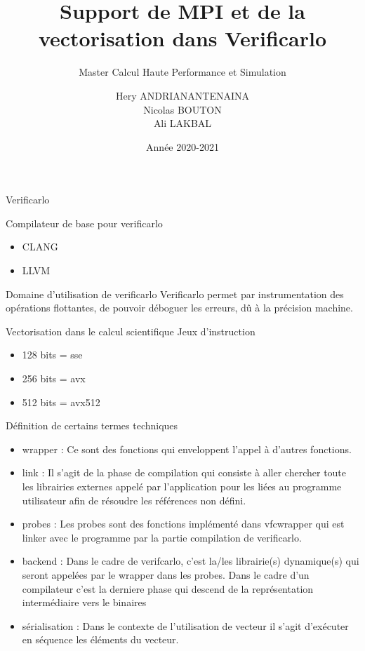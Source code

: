 \documentclass{beamer}
\title[Support pour Verificarlo]{Support de MPI et de la vectorisation dans Verificarlo}
\subtitle{Master Calcul Haute Performance et Simulation}
\author[Hery, Nicolas, Ali]{Hery ANDRIANANTENAINA \\ Nicolas BOUTON \\ Ali LAKBAL}
\institute[]{\textbf{Encadrant:} Eric PETIT}
\date{Année 2020-2021}
\begin{document}
\maketitle

\begin{frame}{Verificarlo}
    \begin{block}{Compilateur de base pour verificarlo}
      \begin{itemize}
          \item CLANG
          \item LLVM
      \end{itemize}
    \end{block}
  \begin{block}{Domaine d'utilisation de verificarlo}
    Verificarlo permet par instrumentation des opérations flottantes, de pouvoir déboguer les erreurs, dû à la précision machine.
  \end{block}
  \begin{block}{Vectorisation dans le calcul scientifique}
    Jeux d'instruction 
        \begin{itemize}
            \item 128 bits = sse
            \item 256 bits = avx
            \item 512 bits = avx512
        \end{itemize}
  \end{block}
\end{frame}

\begin{frame}{Définition de certains termes techniques}
      \begin{itemize}
          \item wrapper : Ce sont des fonctions qui enveloppent l’appel à d’autres fonctions.
          \item link : Il s’agit de la phase de compilation qui consiste à aller chercher toute les librairies externes appelé par l’application pour les liées au programme utilisateur afin de résoudre les références non défini.
          \item probes : Les probes sont des fonctions implémenté dans vfcwrapper qui est linker avec le programme par la partie compilation de verificarlo.
          \item backend : Dans le cadre de verifcarlo, c’est la/les librairie(s) dynamique(s) qui seront appelées par le wrapper dans les probes. Dans le cadre d’un compilateur c’est la derniere phase qui descend de la représentation intermédiaire vers le binaires
          \item sérialisation : Dans le contexte de l’utilisation de vecteur il s’agit d’exécuter en séquence les éléments du vecteur.
      \end{itemize}
\end{frame}
\end{document}
